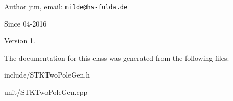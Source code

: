 \begin{DoxyAuthor}{Author}
jtm, email\-:  \href{mailto:milde@hs-fulda.de}{\tt milde@hs-\/fulda.\-de} 
\end{DoxyAuthor}
\begin{DoxySince}{Since}
04-\/2016 
\end{DoxySince}
\begin{DoxyVersion}{Version}
1. 
\end{DoxyVersion}


The documentation for this class was generated from the following files\-:\begin{DoxyCompactItemize}
\item 
include/S\-T\-K\-Two\-Pole\-Gen.\-h\item 
unit/S\-T\-K\-Two\-Pole\-Gen.\-cpp\end{DoxyCompactItemize}
